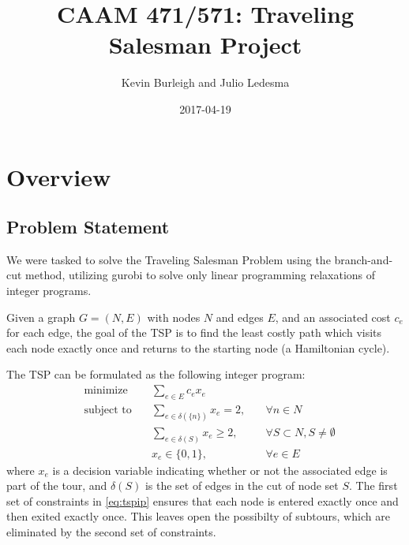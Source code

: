 \documentclass{article}
\title{CAAM 471/571: Traveling Salesman Project}
\date{2017-04-19}
\author{Kevin Burleigh and Julio Ledesma}
\begin{document}
\maketitle


\section{Overview}

\subsection{Problem Statement}

We were tasked
to solve the Traveling Salesman Problem
using the branch-and-cut method,
utilizing gurobi
to solve only linear programming relaxations
of integer programs.

Given a graph $G = (N,E)$ with nodes $N$ and edges $E$,
and an associated cost $c_e$ for each edge,
the goal of the TSP
is to find the least costly path
which visits each node exactly once
and returns to the starting node
(a Hamiltonian cycle).

The TSP can be formulated
as the following integer program:
\begin{equation} \label{eq:tspip}
\begin{alignedat}{3}
 & \text{minimize}         & \sum_{e \in E}{c_e x_e} & \\
 & \text{subject to} \quad & \sum_{e \in \delta(\{n\})}{x_e} = 2, \quad & \forall n \in N \\
 &                   \quad & \sum_{e \in \delta(S)}{x_e} \geq 2,  \quad & \forall S \subset N, S \neq \emptyset \\
 &                         & x_e \in \{ 0,1 \}, \quad                     & \forall e \in E
\end{alignedat}
\end{equation}
where $x_e$ is a decision variable
indicating whether or not
the associated edge is part of the tour,
and $\delta(S)$ is the set of edges
in the cut of node set $S$.
The first set of constraints in \eqref{eq:tspip}
ensures that each node
is entered exactly once
and then exited exactly once.
This leaves open the possibilty of subtours,
which are eliminated by the second set of constraints.
\end{document}

